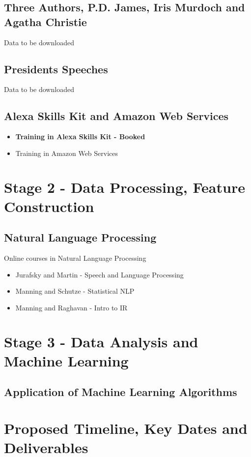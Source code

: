 \documentclass{article}
\begin{document}
	\subsection {Three Authors, P.D. James, Iris Murdoch and Agatha Christie}	
	Data to be downloaded

	\subsection{Presidents Speeches}
	Data to be downloaded

	\subsection{Alexa Skills Kit and Amazon Web Services}
	\begin{itemize}
		\item \textbf{Training in Alexa Skills Kit - Booked}
		\item Training in Amazon Web Services
	\end{itemize}
	

	\section{Stage 2 - Data Processing, Feature Construction}
	\subsection{Natural Language Processing}
	Online courses in Natural Language Processing
	
	\begin{itemize}
		\item Jurafsky and Martin - Speech and Language Processing 
		\item Manning and Schutze - Statistical NLP 
		\item Manning and Raghavan - Intro to IR
	\end{itemize}

	
	\section{Stage 3 - Data Analysis and Machine Learning}
	\subsection{Application of Machine Learning Algorithms}
		
	
	\section{Proposed Timeline, Key Dates and Deliverables}
\end{document}
